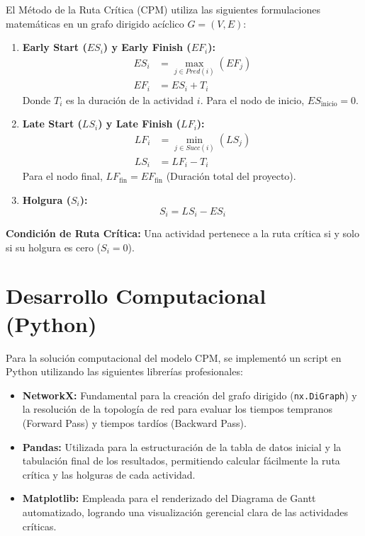 \documentclass[11pt,a4paper]{article}
\begin{document}
El Método de la Ruta Crítica (CPM) utiliza las siguientes formulaciones matemáticas en un grafo dirigido acíclico $G = (V, E)$:

\begin{enumerate}
    \item \textbf{Early Start ($ES_i$) y Early Finish ($EF_i$):}
    \begin{align*}
        ES_i &= \max_{j \in Pred(i)} (EF_j) \\
        EF_i &= ES_i + T_i
    \end{align*}
    Donde $T_i$ es la duración de la actividad $i$. Para el nodo de inicio, $ES_{\text{inicio}} = 0$.

    \item \textbf{Late Start ($LS_i$) y Late Finish ($LF_i$):}
    \begin{align*}
        LF_i &= \min_{j \in Succ(i)} (LS_j) \\
        LS_i &= LF_i - T_i
    \end{align*}
    Para el nodo final, $LF_{\text{fin}} = EF_{\text{fin}}$ (Duración total del proyecto).

    \item \textbf{Holgura ($S_i$):}
    \begin{equation*}
        S_i = LS_i - ES_i
    \end{equation*}
\end{enumerate}

\textbf{Condición de Ruta Crítica:} Una actividad pertenece a la ruta crítica si y solo si su holgura es cero ($S_i = 0$).

\section{Desarrollo Computacional (Python)}

Para la solución computacional del modelo CPM, se implementó un script en Python utilizando las siguientes librerías profesionales:
\begin{itemize}
    \item \textbf{NetworkX:} Fundamental para la creación del grafo dirigido (\texttt{nx.DiGraph}) y la resolución de la topología de red para evaluar los tiempos tempranos (Forward Pass) y tiempos tardíos (Backward Pass).
    \item \textbf{Pandas:} Utilizada para la estructuración de la tabla de datos inicial y la tabulación final de los resultados, permitiendo calcular fácilmente la ruta crítica y las holguras de cada actividad.
    \item \textbf{Matplotlib:} Empleada para el renderizado del Diagrama de Gantt automatizado, logrando una visualización gerencial clara de las actividades críticas.
\end{itemize}
\end{document}
